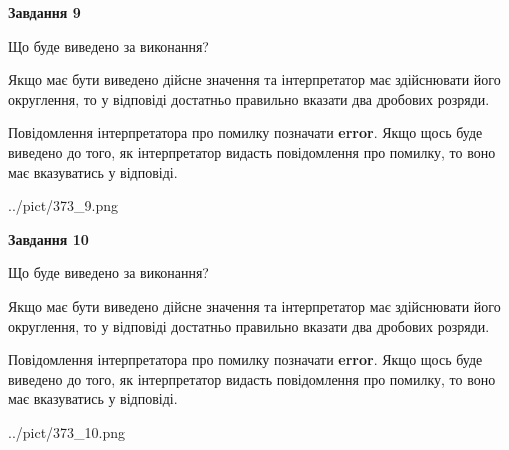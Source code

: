 \documentclass[12pt, ukrainian]{article}
\begin{document}
{\begin {Large}
{\begin {center}\textbf{Завдання 9}\end {center}}\par
Що буде виведено за виконання? \par

Якщо має бути виведено дійсне значення та інтерпретатор має здійснювати його округлення, 
то у відповіді достатньо правильно вказати два дробових розряди.

Повідомлення інтерпретатора про помилку позначати \textbf{error}.
Якщо щось буде виведено до того, як інтерпретатор видасть повідомлення про помилку, 
то воно має вказуватись у відповіді. \par

\begin{center}
	{../pict/373_9.png}
\end{center}
\newpage

{\begin {center}\textbf{Завдання 10}\end {center}}\par
Що буде виведено за виконання? \par

Якщо має бути виведено дійсне значення та інтерпретатор має здійснювати його округлення, 
то у відповіді достатньо правильно вказати два дробових розряди.

Повідомлення інтерпретатора про помилку позначати \textbf{error}.
Якщо щось буде виведено до того, як інтерпретатор видасть повідомлення про помилку, 
то воно має вказуватись у відповіді. \par

\begin{center}
	{../pict/373_10.png}
\end{center}
\newpage

\end {Large}}
\end{document}
